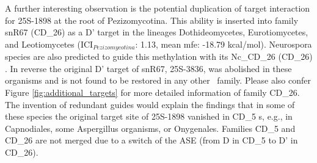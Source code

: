 A further interesting observation is the potential duplication of
target interaction for 25S-1898 at the root of Pezizomycotina. This
ability is inserted into family snR67 (CD\_26) as a D' target in the
lineages Dothideomycetes, Eurotiomycetes, and Leotiomycetes
(ICI$_{Pezizomycotina}$: 1.13, mean mfe: -18.79 kcal/mol). Neurospora
species are also predicted to guide this methylation with its
Nc\_CD\_26 (CD\_26) \sno \cite{Liu:2009}. In reverse the original D'
target of snR67, 25S-3836, was abolished in these organisms and is not
found to be restored in any other \sno\ family.  Please also confer
Figure \ref{fig:additional_targets} for more detailed information of
family CD\_26. The invention of redundant guides would explain the
findings that in some of these species the original target site of
25S-1898 vanished in CD\_5 \sno s, e.g., in Capnodiales, some
Aspergillus organisms, or Onygenales. Families CD\_5 and CD\_26 are
not merged due to a switch of the ASE (from D in CD\_5 to D' in
CD\_26).


